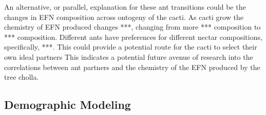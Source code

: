 \documentclass[12pt,a4paper]{article}
\begin{document}
An alternative, or parallel, explanation for these ant transitions could be the changes in EFN composition across ontogeny of the cacti.
As cacti grow the chemistry of EFN produced changes ***, changing from more *** composition to *** composition. 
Different ants have preferences for different nectar compositions\cite{Lach2010}, specifically, ***.
This could provide a potential route for the cacti to select their own ideal partners
This indicates a potential future avenue of research into the correlations between ant partners and the chemistry of the EFN produced by the tree cholla. 

\subsection*{Demographic Modeling}

	
\printbibliography
\end{document}
